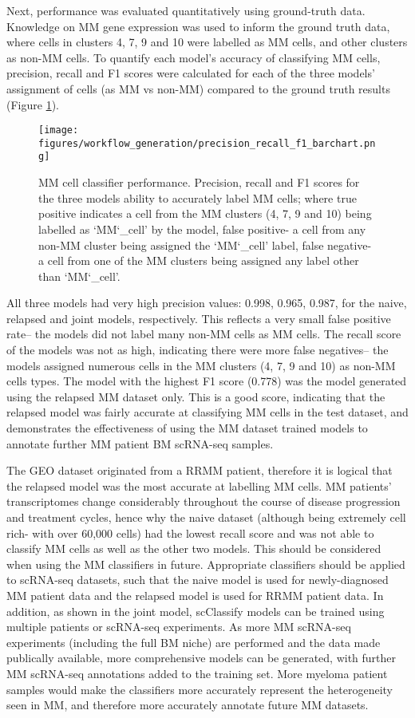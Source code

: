 Next, performance was evaluated quantitatively using ground-truth data.
Knowledge on MM gene expression was used to inform the ground truth data, where cells in clusters 4, 7, 9 and 10 were labelled as MM cells, and other clusters as non-MM cells.
To quantify each model's accuracy of classifying MM cells, precision, recall and F1 scores were calculated for each of the three models' assignment of cells (as MM vs non-MM) compared to the ground truth results (Figure \ref{fig:mm_class_accuracy_bar}).
%
\begin{figure}[htb]
\centering
\texttt{[image: figures/workflow\_generation/precision\_recall\_f1\_barchart.png]}
\caption[MM classifier accuracy]{MM cell classifier performance.
Precision, recall and F1 scores for the three models ability to accurately label MM cells; where true positive indicates a cell from the MM clusters (4, 7, 9 and 10) being labelled as `MM\char`_cell' by the model, false positive- a cell from any non-MM cluster being assigned the `MM\char`_cell' label, false negative- a cell from one of the MM clusters being assigned any label other than `MM\char`_cell'.
}
\label{fig:mm_class_accuracy_bar}
\end{figure}
%
All three models had very high precision values: 0.998, 0.965, 0.987, for the naive, relapsed and joint models, respectively.
This reflects a very small false positive rate-- the models did not label many non-MM cells as MM cells.
The recall score of the models was not as high, indicating there were more false negatives-- the models assigned numerous cells in the MM clusters (4, 7, 9 and 10) as non-MM cells types.
The model with the highest F1 score (0.778) was the model generated using the relapsed MM dataset only.
This is a good score, indicating that the relapsed model was fairly accurate at classifying MM cells in the test dataset, and demonstrates the effectiveness of using the MM dataset trained models to annotate further MM patient BM scRNA-seq samples.

The GEO dataset originated from a RRMM patient, therefore it is logical that the relapsed model was the most accurate at labelling MM cells.
MM patients' transcriptomes change considerably throughout the course of disease progression and treatment cycles, hence why the naive dataset (although being extremely cell rich- with over 60,000 cells) had the lowest recall score and was not able to classify MM cells as well as the other two models.
This should be considered when using the MM classifiers in future.
Appropriate classifiers should be applied to scRNA-seq datasets, such that the naive model is used for newly-diagnosed MM patient data and the relapsed model is used for RRMM patient data.
In addition, as shown in the joint model, scClassify models can be trained using multiple patients or scRNA-seq experiments.
As more MM scRNA-seq experiments (including the full BM niche) are performed and the data made publically available, more comprehensive models can be generated, with further MM scRNA-seq annotations added to the training set.
More myeloma patient samples would make the classifiers more accurately represent the heterogeneity seen in MM, and therefore more accurately annotate future MM datasets.



